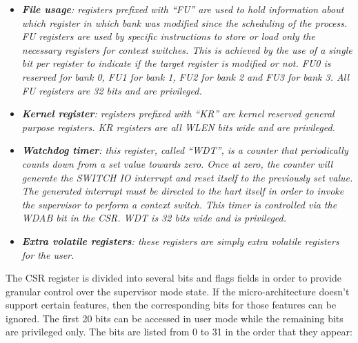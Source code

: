 \begin{itemize}
                \item \textit{\textbf{File usage}: registers prefixed with ``FU'' are used to hold information about which register in which bank was modified since the scheduling of the process. FU registers are used by specific instructions to store or load only the necessary registers for context switches. This is achieved by the use of a single bit per register to indicate if the target register is modified or not. FU0 is reserved for bank 0, FU1 for bank 1, FU2 for bank 2 and FU3 for bank 3. All FU registers are 32 bits and are privileged.}

                \item \textit{\textbf{Kernel register}: registers prefixed with ``KR'' are kernel reserved general purpose registers. KR registers are all WLEN bits wide and are privileged.}

                \item \textit{\textbf{Watchdog timer}: this register, called ``WDT'', is a counter that periodically counts down from a set value towards zero. Once at zero, the counter will generate the SWITCH IO interrupt and reset itself to the previously set value. The generated interrupt must be directed to the hart itself in order to invoke the supervisor to perform a context switch. This timer is controlled via the WDAB bit in the CSR. WDT is 32 bits wide and is privileged.}

                \item \textit{\textbf{Extra volatile registers}: these registers are simply extra volatile registers for the user.}

            \end{itemize}

            The CSR register is divided into several bits and flags fields in order to provide granular control over the supervisor mode state. If the micro-architecture doesn't support certain features, then the corresponding bits for those features can be ignored. The first 20 bits can be accessed in user mode while the remaining bits are privileged only. The bits are listed from 0 to 31 in the order that they appear:

